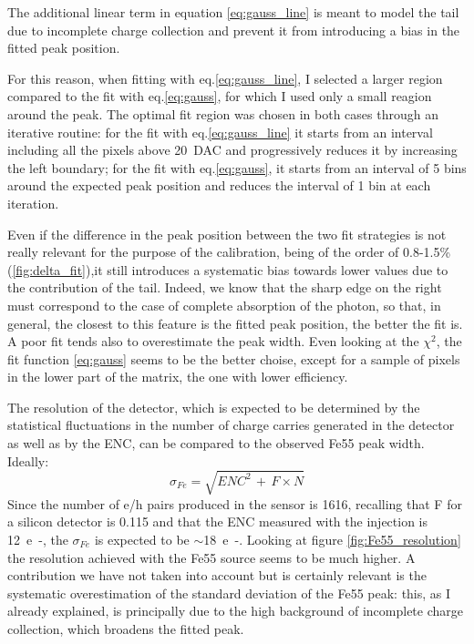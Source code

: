        The additional linear term in equation \ref{eq:gauss_line} is meant to model the tail due to incomplete charge collection and prevent it from introducing a bias in the fitted peak position.

        For this reason, when fitting with eq.\ref{eq:gauss_line}, I selected a larger region compared to the fit with eq.\ref{eq:gauss}, for which I used only a small reagion around the peak. The optimal fit region was chosen in both cases through an iterative routine: for the fit with eq.\ref{eq:gauss_line} it starts from an interval including all the pixels above \SI{20}{DAC} and progressively reduces it by increasing the left boundary; for the fit with eq.\ref{eq:gauss}, it starts from an interval of 5 bins around the expected peak position and reduces the interval of 1 bin at each iteration.
    
        Even if the difference in the peak position between the two fit strategies is not really relevant for the purpose of the calibration, being of the order of 0.8-1.5\% (\ref{fig:delta_fit}),it still introduces a systematic bias towards lower values due to the contribution of the tail. 
        Indeed, we know that the sharp edge on the right must correspond to the case of complete absorption of the photon, so that, in general, the closest to this feature is the fitted peak position, the better the fit is. A poor fit tends also to overestimate the peak width.  
        Even looking at the $\chi^2$, the fit function \ref{eq:gauss} seems to be the better choise, except for a sample of pixels in the lower part of the matrix, the one with lower efficiency.

        The resolution of the detector, which is expected to be determined by the statistical fluctuations in the number of charge carries generated in the detector as well as by the ENC, can be compared to the observed Fe55 peak width. Ideally:
        \begin{equation}
            \sigma_{Fe} = \sqrt{ENC^2 \,+ \,F \times N}
        \end{equation}
        Since the number of e/h pairs produced in the sensor is 1616, recalling that F for a silicon detector is 0.115 and that the ENC measured with the injection is \SI{12}{e-}, the $\sigma_{Fe}$ is expected to be $\sim$\SI{18}{e-}. Looking at figure \ref{fig:Fe55_resolution} the resolution achieved with the Fe55 source seems to be much higher. A contribution we have not taken into account but is certainly relevant is the systematic overestimation of the standard deviation of the Fe55 peak: this, as I already explained, is principally due to the high background of incomplete charge collection, which broadens the fitted peak. 
         
